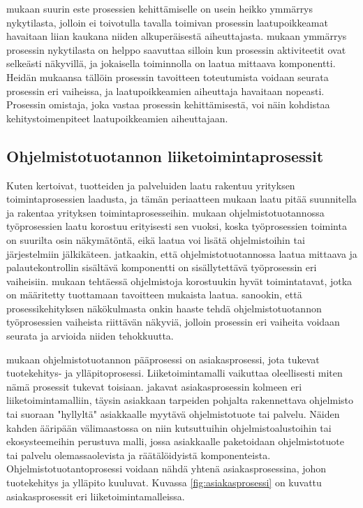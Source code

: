 \documentclass[finnish,12pt,a4paper,pdftex]{article}
\begin{document}
\cite{teollisuustalous} mukaan suurin este prosessien kehittämiselle on usein heikko ymmärrys nykytilasta, jolloin ei toivotulla tavalla toimivan prosessin laatupoikkeamat havaitaan liian kaukana niiden alkuperäisestä aiheuttajasta. \cite{ohjelmistotuotanto} mukaan ymmärrys prosessin nykytilasta on helppo saavuttaa silloin kun prosessin aktiviteetit ovat selkeästi näkyvillä, ja jokaisella toiminnolla on laatua mittaava komponentti. Heidän mukaansa tällöin prosessin tavoitteen toteutumista voidaan seurata prosessin eri vaiheissa, ja laatupoikkeamien aiheuttaja havaitaan nopeasti. Prosessin omistaja, joka vastaa prosessin kehittämisestä, voi näin kohdistaa kehitystoimenpiteet laatupoikkeamien aiheuttajaan. 

\subsection{Ohjelmistotuotannon liiketoimintaprosessit}

Kuten \cite{teollisuustalous} kertoivat, tuotteiden ja palveluiden laatu rakentuu yrityksen toimintaprosessien laadusta, ja tämän periaatteen mukaan laatu pitää suunnitella ja rakentaa yrityksen toimintaprosesseihin. \cite{ohjelmistotuotanto, devops} mukaan ohjelmistotuotannossa työprosessien laatu korostuu erityisesti sen vuoksi, koska työprosessien toiminta on suurilta osin näkymätöntä, eikä laatua voi lisätä ohjelmistoihin tai järjestelmiin jälkikäteen. \citeauthor{devops} jatkaakin, että ohjelmistotuotannossa laatua mittaava ja palautekontrollin sisältävä komponentti on sisällytettävä työprosessin eri vaiheisiin. \cite{okaytannot} mukaan tehtäessä ohjelmistoja korostuukin hyvät toimintatavat, jotka on määritetty tuottamaan tavoitteen mukaista laatua. \cite{ohjelmistotuotanto} sanookin, että prosessikehityksen näkökulmasta onkin haaste tehdä ohjelmistotuotannon työprosessien vaiheista riittävän näkyviä, jolloin prosessin eri vaiheita voidaan seurata ja arvioida niiden tehokkuutta.

\cite{ohjelmistotuotanto} mukaan ohjelmistotuotannon pääprosessi on asiakasprosessi, jota tukevat tuotekehitys- ja ylläpitoprosessi. Liiketoimintamalli vaikuttaa oleellisesti miten nämä prosessit tukevat toisiaan. \citeauthor{ohjelmistotuotanto} jakavat asiakasprosessin kolmeen eri liiketoimintamalliin, täysin asiakkaan tarpeiden pohjalta rakennettava ohjelmisto tai suoraan "hyllyltä" asiakkaalle myytävä ohjelmistotuote tai palvelu. Näiden kahden ääripään välimaastossa on niin kutsuttuihin ohjelmistoalustoihin tai ekosysteemeihin perustuva malli, jossa asiakkaalle paketoidaan ohjelmistotuote tai palvelu olemassaolevista ja räätälöidyistä komponenteista. Ohjelmistotuotantoprosessi voidaan nähdä yhtenä asiakasprosessina, johon tuotekehitys ja ylläpito kuuluvat. Kuvassa \ref{fig:asiakasprosessi} on kuvattu asiakasprosessit eri liiketoimintamalleissa.
\end{document}
